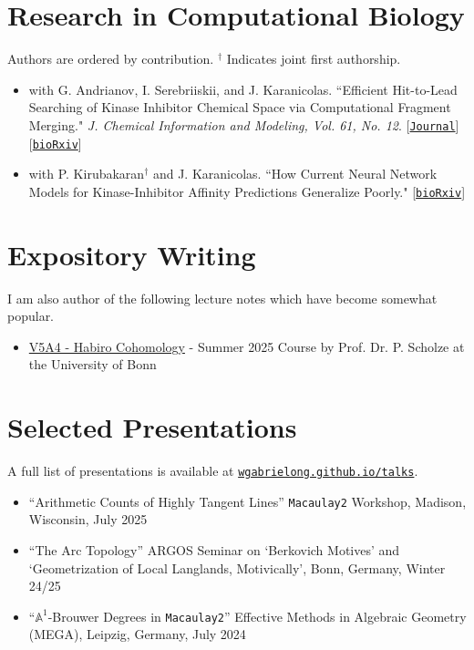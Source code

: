 \documentclass[letterpaper,11pt]{article}
\begin{document}
\section{Research in Computational Biology}
\scriptsize{Authors are ordered by contribution. $^{\dagger}$ Indicates joint first authorship.}\normalsize
\begin{itemize}[leftmargin=*]
    \item with G. Andrianov, I. Serebriiskii, and J. Karanicolas. ``Efficient Hit-to-Lead Searching of Kinase Inhibitor Chemical Space via Computational Fragment Merging." \emph{J. Chemical Information and Modeling, Vol. 61, No. 12}. [\texttt{\href{https://doi.org/10.1021/acs.jcim.1c00630}{Journal}}] [\texttt{\href{https://doi.org/10.1101/2021.06.01.446684}{bioRxiv}}]
  \item with P. Kirubakaran$^{\dagger}$ and J. Karanicolas. ``How Current Neural Network Models for Kinase-Inhibitor Affinity Predictions Generalize Poorly." [\texttt{\href{https://doi.org/10.1101/2023.09.04.556234}{bioRxiv}}]
\end{itemize}
\section{Expository Writing}
\scriptsize{I am also author of the following lecture notes which have become somewhat popular.}\normalsize{}
\begin{itemize}[leftmargin=*]
 \item \href{https://wgabrielong.github.io/Bonn-Summer-25/V5A4-Habiro-Cohomology/Habiro_Cohomology_Notes.pdf}{V5A4 - Habiro Cohomology} - Summer 2025 Course by Prof. Dr. P. Scholze at the University of Bonn
\end{itemize}
\section{Selected Presentations}
\scriptsize{A full list of presentations is available at \href{https://wgabrielong.github.io/talks/}{\texttt{wgabrielong.github.io/talks}}.}\normalsize{}
\begin{itemize}[leftmargin=*]
  \item ``Arithmetic Counts of Highly Tangent Lines'' \texttt{Macaulay2} Workshop, Madison, Wisconsin, July 2025
  \item ``The Arc Topology'' ARGOS Seminar on `Berkovich Motives' and `Geometrization of Local Langlands, Motivically', Bonn, Germany, Winter 24/25
  \item ``$\mathbb{A}^{1}$-Brouwer Degrees in \texttt{Macaulay2}'' Effective Methods in Algebraic Geometry (MEGA), Leipzig, Germany, July 2024
\end{itemize}
\end{document}
